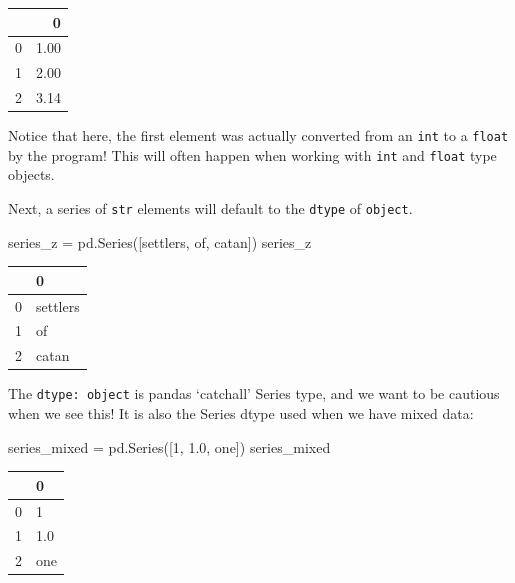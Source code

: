 \documentclass[
  letterpaper,
  DIV=11,
  numbers=noendperiod]{scrreprt}
\newenvironment{Shaded}{\begin{snugshade}}{\end{snugshade}}
\newcommand{\DecValTok}[1]{\textcolor[rgb]{0.68,0.00,0.00}{#1}}
\newcommand{\FloatTok}[1]{\textcolor[rgb]{0.68,0.00,0.00}{#1}}
\newcommand{\NormalTok}[1]{\textcolor[rgb]{0.00,0.23,0.31}{#1}}
\newcommand{\OperatorTok}[1]{\textcolor[rgb]{0.37,0.37,0.37}{#1}}
\newcommand{\StringTok}[1]{\textcolor[rgb]{0.13,0.47,0.30}{#1}}
\begin{document}
\begin{tabular}{lr}
\toprule
{} &     0 \\
\midrule
0 &  1.00 \\
1 &  2.00 \\
2 &  3.14 \\
\bottomrule
\end{tabular}

Notice that here, the first element was actually converted from an
\texttt{int} to a \texttt{float} by the program! This will often happen
when working with \texttt{int} and \texttt{float} type objects.

Next, a series of \texttt{str} elements will default to the
\texttt{dtype} of \texttt{object}.

\begin{Shaded}
\begin{Highlighting}[]
\NormalTok{series\_z }\OperatorTok{=}\NormalTok{ pd.Series([}\StringTok{\textquotesingle{}settlers\textquotesingle{}}\NormalTok{, }\StringTok{\textquotesingle{}of\textquotesingle{}}\NormalTok{, }\StringTok{\textquotesingle{}catan\textquotesingle{}}\NormalTok{])}
\NormalTok{series\_z}
\end{Highlighting}
\end{Shaded}

\begin{tabular}{ll}
\toprule
{} &         0 \\
\midrule
0 &  settlers \\
1 &        of \\
2 &     catan \\
\bottomrule
\end{tabular}

The \texttt{dtype:\ object} is pandas `catchall' Series type, and we
want to be cautious when we see this! It is also the Series dtype used
when we have mixed data:

\begin{Shaded}
\begin{Highlighting}[]
\NormalTok{series\_mixed }\OperatorTok{=}\NormalTok{ pd.Series([}\DecValTok{1}\NormalTok{, }\FloatTok{1.0}\NormalTok{, }\StringTok{\textquotesingle{}one\textquotesingle{}}\NormalTok{])}
\NormalTok{series\_mixed}
\end{Highlighting}
\end{Shaded}

\begin{tabular}{ll}
\toprule
{} &    0 \\
\midrule
0 &    1 \\
1 &  1.0 \\
2 &  one \\
\bottomrule
\end{tabular}
\end{document}
